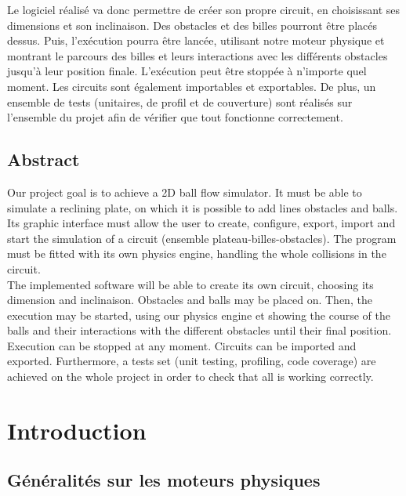 \documentclass{report}
\begin{document}
Le logiciel réalisé va donc permettre de créer son propre circuit, en choisissant ses dimensions et son inclinaison. Des obstacles et des billes pourront être placés dessus. Puis, l'exécution pourra être lancée, utilisant notre moteur physique et montrant le parcours des billes et leurs interactions avec les différents obstacles jusqu'à leur position finale. L'exécution peut être stoppée à n’importe quel moment. Les circuits sont également importables et exportables. De plus, un ensemble de tests (unitaires, de profil et de couverture) sont réalisés sur l’ensemble du projet afin de vérifier que tout fonctionne correctement.  \\

\section*{Abstract}

Our project goal is to achieve a 2D ball flow simulator. It must be able to simulate a reclining plate, on which it is possible to add lines obstacles and balls. Its graphic interface must allow the user to create, configure, export, import and start the simulation of a circuit (ensemble plateau-billes-obstacles). The program must be fitted with its own physics engine, handling the whole collisions in the circuit. \\

The implemented software will be able to create its own circuit, choosing its dimension and inclinaison. Obstacles and balls may be placed on. Then, the execution may be started, using our physics engine et showing the course of the balls and their interactions with the different obstacles until their final position. Execution can be stopped at any moment. Circuits can be imported and exported. Furthermore, a tests set (unit testing, profiling, code coverage) are achieved on the whole project in order to check that all is working correctly.


\tableofcontents

\listoffigures

\chapter{Introduction}

\section{Généralités sur les moteurs physiques}
\end{document}
